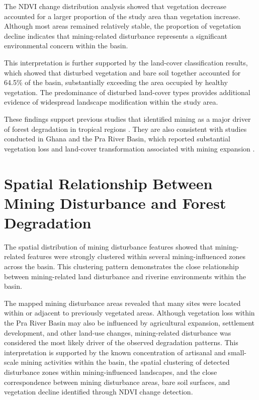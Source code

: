 \documentclass[a4paper,12pt]{report}
\begin{document}
The NDVI change distribution analysis showed that vegetation decrease accounted for a larger proportion of the study area than vegetation increase. Although most areas remained relatively stable, the proportion of vegetation decline indicates that mining-related disturbance represents a significant environmental concern within the basin.

This interpretation is further supported by the land-cover classification results, which showed that disturbed vegetation and bare soil together accounted for 64.5\% of the basin, substantially exceeding the area occupied by healthy vegetation. The predominance of disturbed land-cover types provides additional evidence of widespread landscape modification within the study area.

These findings support previous studies that identified mining as a major driver of forest degradation in tropical regions \citep{asner2005selective,sonter2017mining}. They are also consistent with studies conducted in Ghana and the Pra River Basin, which reported substantial vegetation loss and land-cover transformation associated with mining expansion \citep{awotwi2018pra,barenblitt2021ghana}.

\section{Spatial Relationship Between Mining Disturbance and Forest Degradation}

The spatial distribution of mining disturbance features showed that mining-related features were strongly clustered within several mining-influenced zones across the basin. This clustering pattern demonstrates the close relationship between mining-related land disturbance and riverine environments within the basin.

The mapped mining disturbance areas revealed that many sites were located within or adjacent to previously vegetated areas. Although vegetation loss within the Pra River Basin may also be influenced by agricultural expansion, settlement development, and other land-use changes, mining-related disturbance was considered the most likely driver of the observed degradation patterns. This interpretation is supported by the known concentration of artisanal and small-scale mining activities within the basin, the spatial clustering of detected disturbance zones within mining-influenced landscapes, and the close correspondence between mining disturbance areas, bare soil surfaces, and vegetation decline identified through NDVI change detection.
\end{document}
